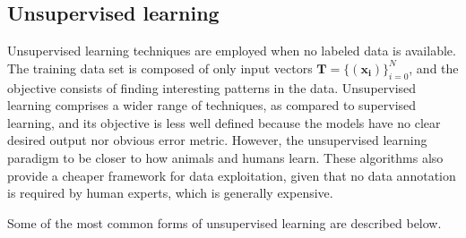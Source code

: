 \subsection{Unsupervised learning}
Unsupervised learning techniques are employed when no labeled data is available. The training data set is composed of only input vectors $\mathbf{T}=\{(\mathbf{x_i})\}_{i=0}^{N}$, and the objective consists of finding interesting patterns in the data. Unsupervised learning comprises a wider range of techniques, as compared to supervised learning, and its objective is less well defined because the models have no clear desired output nor obvious error metric. However, the unsupervised learning paradigm to be closer to how animals and humans learn. These algorithms also provide a cheaper framework for data exploitation, given that no data annotation is required by human experts, which is generally expensive. 

Some of the most common forms of unsupervised learning are described below.

